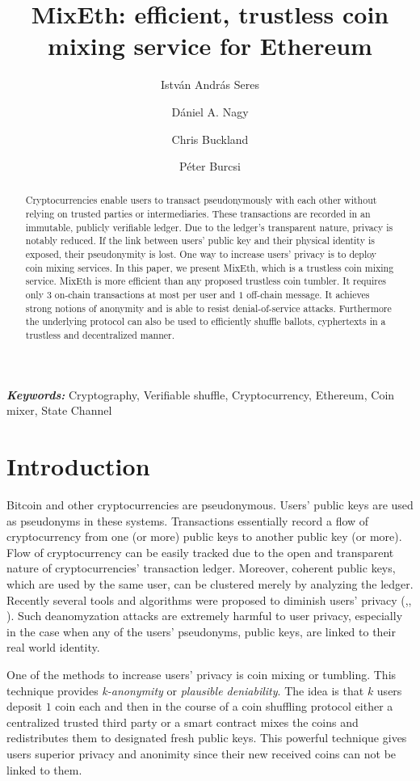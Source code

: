 \documentclass[a4paper]{article}
\title{MixEth: efficient, trustless coin mixing service for Ethereum}
\author[1]{István András Seres}
\author[1]{Dániel A. Nagy}
\author[2]{Chris Buckland}
\author[1]{Péter Burcsi}
\affil[1]{Department of Computer Algebra, Eötvös Loránd University}
\affil[2]{King's College London}
\theoremstyle{definition}
\providecommand{\keywords}[1]{\textbf{\textit{Keywords:}} #1}
\begin{document}
\maketitle

\begin{abstract}
Cryptocurrencies enable users to transact pseudonymously with each other without relying on trusted parties or intermediaries. These transactions are recorded in an immutable, publicly verifiable ledger. Due to the ledger's transparent nature, privacy is notably reduced. If the link between users' public key and their physical identity is exposed, their pseudonymity is lost. One way to increase users' privacy is to deploy coin mixing services. In this paper, we present MixEth, which is a trustless coin mixing service. MixEth is more efficient than any proposed trustless coin tumbler. It requires only $3$ on-chain transactions at most per user and $1$ off-chain message. It achieves strong notions of anonymity and is able to resist denial-of-service attacks. Furthermore the underlying protocol can also be used to efficiently shuffle ballots, cyphertexts in a trustless and decentralized manner.     
\end{abstract}
\keywords{Cryptography, Verifiable shuffle, Cryptocurrency, Ethereum, Coin mixer, State Channel}

\section{Introduction}
Bitcoin \cite{nakamoto2008bitcoin} and other cryptocurrencies are pseudonymous. Users' public keys are used as pseudonyms in these systems. Transactions essentially record a flow of cryptocurrency from one (or more) public keys to another public key (or more). Flow of cryptocurrency can be easily tracked due to the open and transparent nature of cryptocurrencies' transaction ledger. Moreover, coherent public keys, which are used by the same user, can be clustered merely by analyzing the ledger. Recently several tools and algorithms were proposed to diminish users' privacy (\cite{meiklejohn2013fistful},\cite{moser2013inquiry}, \cite{moreno2016listening}). Such deanomyzation attacks are extremely harmful to user privacy, especially in the case when any of the users' pseudonyms, public keys, are linked to their real world identity. 

One of the methods to increase users' privacy is coin mixing or tumbling. This technique provides \textit{k-anonymity} or \textit{plausible deniability}. The idea is that $k$ users deposit $1$ coin each and then in the course of a coin shuffling protocol either a centralized trusted third party or a smart contract mixes the coins and redistributes them to designated fresh public keys. This powerful technique gives users superior privacy and anonimity since their new received coins can not be linked to them.
\end{document}
